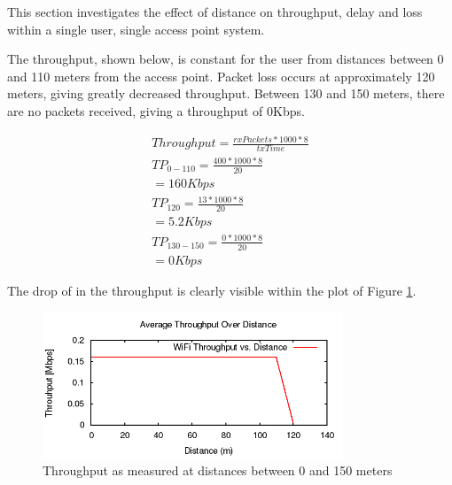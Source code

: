 This section investigates the effect of distance on throughput, delay and loss
within a single user, single access point system.

\par The throughput, shown below, is constant for the user from distances
between 0 and 110 meters from the access point. Packet loss occurs at
approximately 120 meters, giving greatly decreased throughput. Between 130 and
150 meters, there are no packets received, giving a throughput of 0Kbps.

\begin{gather*}
	Throughput=\frac{rxPackets*1000*8}{txTime} \\
	TP_{0-110}=\frac{400*1000*8}{20}\\
	= 160Kbps\\
	TP_{120}= \frac{13*1000*8}{20}\\
	= 5.2Kbps \\
	TP_{130-150}=\frac{0*1000*8}{20}\\
	= 0Kbps
\end{gather*}

The drop of in the throughput is clearly visible within the plot of Figure
\ref{fig:QBthroughput}.

\begin{figure}[H]
	\centering
	\includegraphics[width=0.8\textwidth]{images/EE500/QB/Images/wifi-throughput}
	\caption{Throughput as measured at distances between 0 and 150 meters}
	\label{fig:QBthroughput}
\end{figure}

